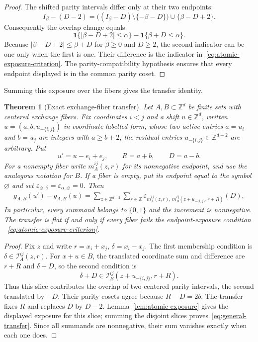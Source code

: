 \documentclass[pdflatex,sn-mathphys-num]{sn-jnl}
\theoremstyle{thmstyleone}
\newtheorem{theorem}{Theorem}[section]
\theoremstyle{thmstylethree}
\theoremstyle{thmstyletwo}
\newcommand{\Z}{\mathbb Z}
\begin{document}
\begin{proof}
The shifted parity intervals differ only at their two endpoints:
\[
 I_\beta-(D-2)
 =\bigl((I_\beta-D)\setminus\{-\beta-D\}\bigr)
   \cup\{\beta-D+2\}.
\]
Consequently the overlap change equals
\[
 \mathbf 1\{|\beta-D+2|\le\alpha\}
 -\mathbf 1\{\beta+D\le\alpha\}.
\]
Because $|\beta-D+2|\le\beta+D$ for $\beta\ge0$ and $D\ge2$, the second
indicator can be one only when the first is one.  Their difference is the
indicator in~\eqref{eq:atomic-exposure-criterion}.  The parity-compatibility
hypothesis ensures that every endpoint displayed is in the common parity
coset.
\end{proof}

Summing this exposure over the fibers gives the transfer identity.

\begin{theorem}[Exact exchange-fiber transfer]
\label{thm:general-transfer}
Let $A,B\subset\Z^d$ be finite sets with centered exchange fibers.  Fix
coordinates $i<j$ and a shift $u\in\Z^d$, written
$u=(a,b,u_{-\{i,j\}})$ in coordinate-labelled form, whose two active entries
$a=u_i$ and $b=u_j$ are integers with $a\ge b+2$; the residual entries
$u_{-\{i,j\}}\in\Z^{d-2}$ are arbitrary.  Put
\[
 u'=u-e_i+e_j,\qquad R=a+b,\qquad D=a-b.
\]
For a nonempty fiber write $m_A^{ij}(z,r)$ for its nonnegative endpoint, and
use the analogous notation for $B$.  If a fiber is empty, put its endpoint
equal to the symbol $\varnothing$ and set
$\varepsilon_{\varnothing,\beta}
=\varepsilon_{\alpha,\varnothing}=0$.  Then
\begin{align}
 g_{A,B}(u')-g_{A,B}(u)
  =\sum_{z\in\Z^{d-2}}\sum_{r\in\Z}
  \varepsilon_{m_A^{ij}(z,r),\,
  m_B^{ij}(z+u_{-\{i,j\}},r+R)}(D),                 \label{eq:general-transfer}
\end{align}
In particular, every summand belongs to $\{0,1\}$ and the increment is
nonnegative.  The transfer is flat if and
only if every fiber fails the endpoint-exposure condition
~\eqref{eq:atomic-exposure-criterion}.
\end{theorem}

\begin{proof}
Fix $z$ and write $r=x_i+x_j$, $\delta=x_i-x_j$.  The first membership
condition is
$\delta\in\mathcal I_A^{ij}(z,r)$.  For $x+u\in B$, the translated coordinate
sum and difference are $r+R$ and $\delta+D$, so the second condition is
\[
 \delta+D\in
 \mathcal I_B^{ij}(z+u_{-\{i,j\}},r+R).
\]
Thus this slice contributes the overlap of two centered parity intervals, the
second translated by $-D$.  Their parity cosets agree because
$R-D=2b$.  The transfer fixes $R$ and replaces $D$ by $D-2$.
Lemma~\ref{lem:atomic-exposure} gives the displayed exposure for this slice;
summing the disjoint slices proves~\eqref{eq:general-transfer}.  Since all
summands are nonnegative, their sum vanishes exactly when each one does.
\end{proof}
\end{document}

